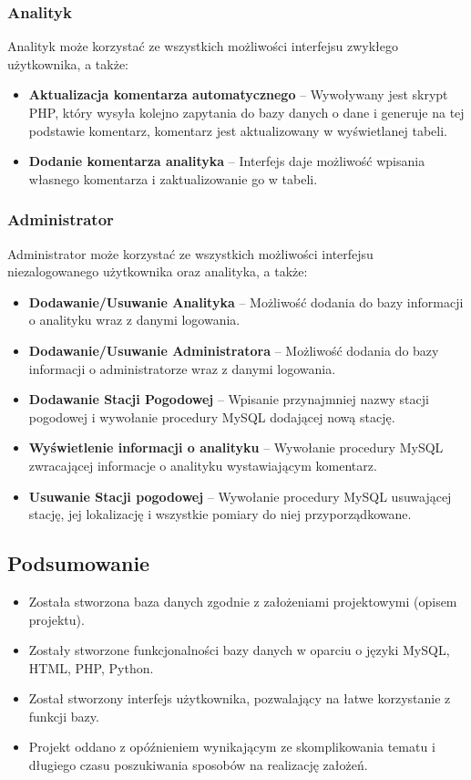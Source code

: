 \documentclass[12pt,a4paper]{article}
\begin{document}
\subsubsection{Analityk}
Analityk może korzystać ze wszystkich możliwości interfejsu zwykłego użytkownika, a także:
\begin{itemize}
\item \textbf{Aktualizacja komentarza automatycznego} -- Wywoływany jest skrypt PHP, który wysyła kolejno zapytania do bazy danych o dane i generuje na tej podstawie komentarz, komentarz jest aktualizowany w wyświetlanej tabeli.
\item \textbf{Dodanie komentarza analityka} -- Interfejs daje możliwość wpisania własnego komentarza i zaktualizowanie go w tabeli.
\end{itemize}
\subsubsection{Administrator}
Administrator może korzystać ze wszystkich możliwości interfejsu niezalogowanego użytkownika oraz analityka, a także:
\begin{itemize}
\item \textbf{Dodawanie/Usuwanie Analityka} -- Możliwość dodania do bazy informacji o analityku wraz z danymi logowania.
\item \textbf{Dodawanie/Usuwanie Administratora} -- Możliwość dodania do bazy informacji o administratorze wraz z danymi logowania.
\item \textbf{Dodawanie Stacji Pogodowej} -- Wpisanie przynajmniej nazwy stacji pogodowej i wywołanie procedury MySQL dodającej nową stację.
\item \textbf{Wyświetlenie informacji o analityku} -- Wywołanie procedury MySQL zwracającej informacje o analityku wystawiającym komentarz.
\item \textbf{Usuwanie Stacji pogodowej} -- Wywołanie procedury MySQL usuwającej stację, jej lokalizację i wszystkie pomiary do niej przyporządkowane.
\end{itemize}
\subsection{Podsumowanie}
\begin{itemize}
\item Została stworzona baza danych zgodnie z założeniami projektowymi (opisem projektu).
\item Zostały stworzone funkcjonalności bazy danych w oparciu o języki MySQL, HTML, PHP, Python.
\item Został stworzony interfejs użytkownika, pozwalający na łatwe korzystanie z funkcji bazy.
\item Projekt oddano z opóźnieniem wynikającym ze skomplikowania tematu i długiego czasu poszukiwania sposobów na realizację założeń.
\end{itemize}
\end{document}
